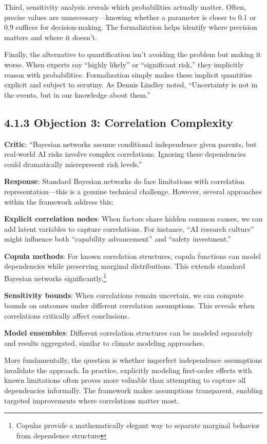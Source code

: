 \documentclass[
  11pt,
  letterpaper,
]{book}
\begin{document}
Third, sensitivity analysis reveals which probabilities actually matter.
Often, precise values are unnecessary---knowing whether a parameter is
closer to 0.1 or 0.9 suffices for decision-making. The formalization
helps identify where precision matters and where it doesn't.

Finally, the alternative to quantification isn't avoiding the problem
but making it worse. When experts say ``highly likely'' or ``significant
risk,'' they implicitly reason with probabilities. Formalization simply
makes these implicit quantities explicit and subject to scrutiny. As
Dennis Lindley noted, ``Uncertainty is not in the events, but in our
knowledge about them.''

\subsection{4.1.3 Objection 3: Correlation
Complexity}\label{sec-correlation-complexity}

\textbf{Critic}: ``Bayesian networks assume conditional independence
given parents, but real-world AI risks involve complex correlations.
Ignoring these dependencies could dramatically misrepresent risk
levels.''

\textbf{Response}: Standard Bayesian networks do face limitations with
correlation representation---this is a genuine technical challenge.
However, several approaches within the framework address this:

\textbf{Explicit correlation nodes}: When factors share hidden common
causes, we can add latent variables to capture correlations. For
instance, ``AI research culture'' might influence both ``capability
advancement'' and ``safety investment.''

\textbf{Copula methods}: For known correlation structures, copula
functions can model dependencies while preserving marginal
distributions. This extends standard Bayesian networks
significantly.\footnote{Copulas provide a mathematically elegant way to
  separate marginal behavior from dependence structure}

\textbf{Sensitivity bounds}: When correlations remain uncertain, we can
compute bounds on outcomes under different correlation assumptions. This
reveals when correlations critically affect conclusions.

\textbf{Model ensembles}: Different correlation structures can be
modeled separately and results aggregated, similar to climate modeling
approaches.

More fundamentally, the question is whether imperfect independence
assumptions invalidate the approach. In practice, explicitly modeling
first-order effects with known limitations often proves more valuable
than attempting to capture all dependencies informally. The framework
makes assumptions transparent, enabling targeted improvements where
correlations matter most.
\end{document}
